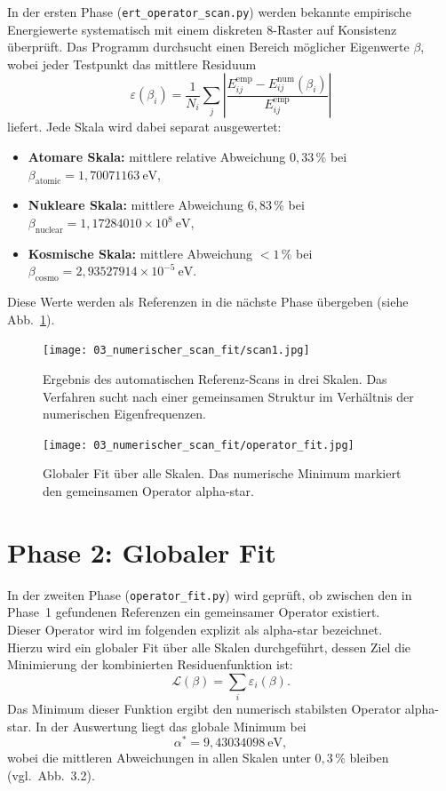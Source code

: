In der ersten Phase (\texttt{ert\_operator\_scan.py}) werden bekannte empirische Energiewerte
systematisch mit einem diskreten $8$-Raster auf Konsistenz überprüft.  
Das Programm durchsucht einen Bereich möglicher Eigenwerte $\beta$,
wobei jeder Testpunkt das mittlere Residuum
\[
  \varepsilon(\beta_i)
  = \frac{1}{N_i}\sum_j 
    \left|\frac{E^{\mathrm{emp}}_{ij} - E^{\mathrm{num}}_{ij}(\beta_i)}{E^{\mathrm{emp}}_{ij}}\right|
\]
liefert.  
Jede Skala wird dabei separat ausgewertet:

\begin{itemize}
  \item \textbf{Atomare Skala:} mittlere relative Abweichung $0{,}33\,\%$ bei $\beta_\mathrm{atomic}=1{,}70071163~\si{\electronvolt}$,
  \item \textbf{Nukleare Skala:} mittlere Abweichung $6{,}83\,\%$ bei $\beta_\mathrm{nuclear}=1{,}17284010\times10^8~\si{\electronvolt}$,
  \item \textbf{Kosmische Skala:} mittlere Abweichung $<1\,\%$ bei $\beta_\mathrm{cosmo}=2{,}93527914\times10^{-5}~\si{\electronvolt}$.
\end{itemize}

Diese Werte werden als Referenzen in die nächste Phase übergeben
(siehe Abb.~\ref{fig:scan1}).

\begin{figure}
  \centering
  \texttt{[image: 03\_numerischer\_scan\_fit/scan1.jpg]}
  \caption{Ergebnis des automatischen Referenz-Scans in drei Skalen.
  Das Verfahren sucht nach einer gemeinsamen Struktur im Verhältnis
  der numerischen Eigenfrequenzen.}
  \label{fig:scan1}
\end{figure}

\newpage

\begin{figure}
  \centering
  \texttt{[image: 03\_numerischer\_scan\_fit/operator\_fit.jpg]}
  \caption{Globaler Fit über alle Skalen. Das numerische Minimum markiert
  den gemeinsamen Operator \gls{alpha-star}.}
  \label{fig:fit_operator}
\end{figure}

\section{Phase 2: Globaler Fit}
\label{sec:fit}

In der zweiten Phase (\texttt{operator\_fit.py}) wird geprüft, ob zwischen
den in Phase~1 gefundenen Referenzen ein gemeinsamer Operator existiert.
\\
Dieser Operator wird im folgenden explizit als \gls{alpha-star} bezeichnet.
\\
Hierzu wird ein globaler Fit über alle Skalen durchgeführt,
dessen Ziel die Minimierung der kombinierten Residuenfunktion ist:
\[
  \mathcal{L}(\beta)
  = \sum_i \varepsilon_i(\beta).
\]
Das Minimum dieser Funktion ergibt den numerisch stabilsten Operator \gls{alpha-star}.
In der Auswertung liegt das globale Minimum bei
\[
  \alpha^* = 9{,}43034098~\si{\electronvolt},
\]
wobei die mittleren Abweichungen in allen Skalen unter $0{,}3\,\%$ bleiben
(vgl.~Abb.~3.2).



